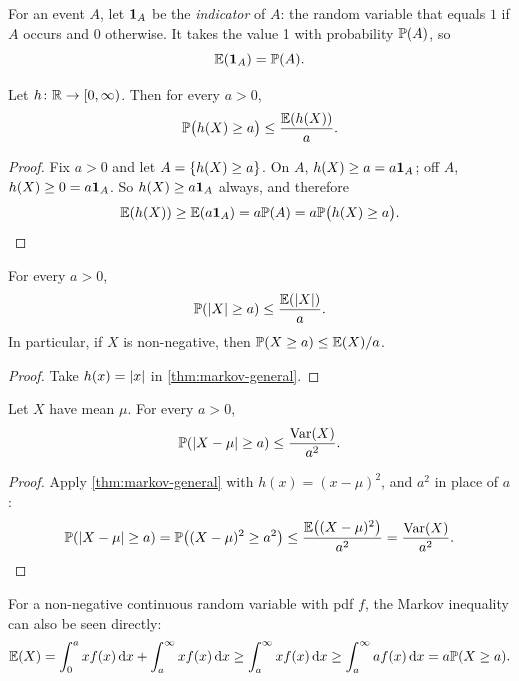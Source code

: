 For an event $A$, let $\mathbf{1}_A$ be the \emph{indicator} of $A$: the random variable that equals $1$ if $A$ occurs and $0$ otherwise. It takes the value 1 with probability $\mathbb{P}(A)$, so
\[
  \operatorname{\mathbb{E}}(\mathbf{1}_A) = \mathbb{P}(A).
\]

\begin{theorem}\label{thm:markov-general}
Let $h \colon \mathbb{R} \to [0, \infty)$. Then for every $a > 0$,
\[
  \mathbb{P}\bigl(h(X) \ge a\bigr) \le \frac{\operatorname{\mathbb{E}}(h(X))}{a}.
\]
\end{theorem}

\begin{proof}
Fix $a > 0$ and let $A = \left\{ h(X) \ge a \right\}$. On $A$, $h(X) \ge a = a \mathbf{1}_A$; off $A$, $h(X) \ge 0 = a \mathbf{1}_A$. So $h(X) \ge a \mathbf{1}_A$ always, and therefore
\[
  \operatorname{\mathbb{E}}(h(X)) \ge \operatorname{\mathbb{E}}(a \mathbf{1}_A) = a \mathbb{P}(A) = a \mathbb{P}\bigl(h(X) \ge a\bigr). \qedhere
\]
\end{proof}

\begin{corollary}\label{cor:markov}
For every $a > 0$,
\[
  \mathbb{P}(\lvert X\rvert \ge a) \le \frac{\operatorname{\mathbb{E}}(\lvert X\rvert)}{a}.
\]
In particular, if $X$ is non-negative, then $\mathbb{P}(X \ge a) \le \operatorname{\mathbb{E}}(X) / a$.
\end{corollary}

\begin{proof}
Take $h(x) = \lvert x\rvert$ in \cref{thm:markov-general}.
\end{proof}

\begin{corollary}\label{cor:chebyshev}
Let $X$ have mean $\mu$. For every $a > 0$,
\[
  \mathbb{P}(\lvert X - \mu\rvert \ge a) \le \frac{\operatorname{Var}(X)}{a^2}.
\]
\end{corollary}

\begin{proof}
Apply \cref{thm:markov-general} with $h(x) = (x - \mu)^2$, and $a^2$ in place of $a$:
\[
  \mathbb{P}(\lvert X - \mu\rvert \ge a) = \mathbb{P}\bigl((X - \mu)^2 \ge a^2\bigr) \le \frac{\operatorname{\mathbb{E}}\bigl((X - \mu)^2\bigr)}{a^2} = \frac{\operatorname{Var}(X)}{a^2}. \qedhere
\]
\end{proof}

\begin{remark}
For a non-negative continuous random variable with pdf $f$, the Markov inequality can also be seen directly:
\[
  \operatorname{\mathbb{E}}(X) = \int_0^a x f(x) \mathop{}\!\mathrm{d} x + \int_a^\infty x f(x) \mathop{}\!\mathrm{d} x \ge \int_a^\infty x f(x) \mathop{}\!\mathrm{d} x \ge \int_a^\infty a f(x) \mathop{}\!\mathrm{d} x = a \mathbb{P}(X \ge a).
\]
\end{remark}
